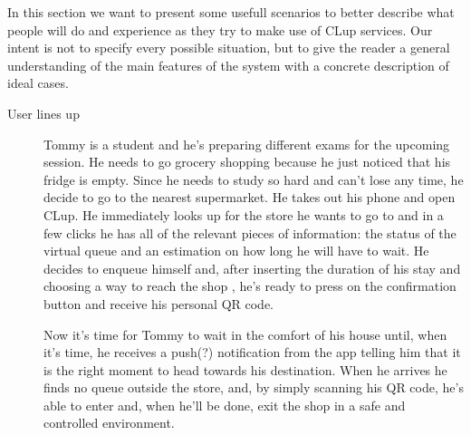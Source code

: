 In this section we want to present some usefull scenarios to better describe what people will do and experience as they try to make use of CLup services. Our intent is not to specify every possible situation, but to give the reader a general understanding of the main features of the system with a concrete description of ideal cases.
 
\begin{description}
    \item[User lines up] 
    Tommy is a student and he’s preparing different exams for the upcoming session.
    He needs to go grocery shopping because he just noticed that his fridge is empty. Since he needs to study so hard and can't lose any time, he decide to go to the nearest supermarket. He takes out his phone and open CLup. He immediately looks up for the store he wants to go to and in a few clicks he has all of the relevant pieces of information: the status of the virtual queue and an estimation on how long he will have to wait.  He decides to enqueue himself and, after inserting the duration of his stay and choosing a way to reach the shop , he's ready to press on the confirmation button and receive his personal QR code. 

    Now it's time for Tommy to wait in the comfort of his house until, when it’s time, he receives a push(?) notification from the app telling him that it is the right moment to head towards his destination. When he arrives he finds no queue outside the store, and, by simply scanning his QR code, he's able to enter and, when he’ll be done, exit the shop in a safe and controlled environment.


\end{description}
